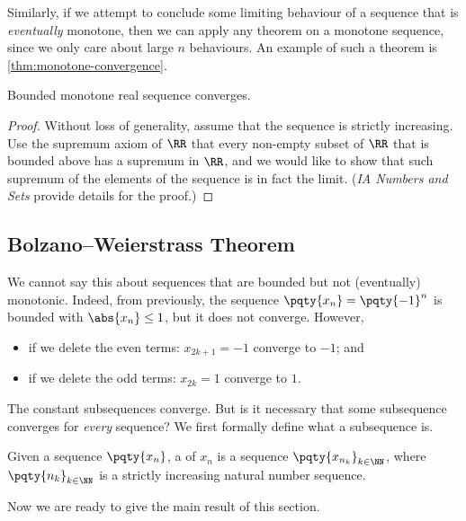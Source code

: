 Similarly, if we attempt to conclude some limiting behaviour of a sequence that is \emph{eventually} monotone, then we can apply any theorem on a monotone sequence, since we only care about large \(n\) behaviours. An example of such a theorem is \autoref{thm:monotone-convergence}.

\begin{theorem}
    \label{thm:monotone-convergence}%
    Bounded monotone real sequence converges.
\end{theorem}

\begin{proof}
    Without loss of generality, assume that the sequence is strictly increasing. Use the supremum axiom of \(\RR\) that every non-empty subset of \(\RR\) that is bounded above has a supremum in \(\RR\), and we would like to show that such supremum of the elements of the sequence is in fact the limit. (\textit{IA Numbers and Sets} provide details for the proof.)
\end{proof}

\subsection{Bolzano--Weierstrass Theorem}

We cannot say this about sequences that are bounded but not (eventually) monotonic. Indeed, from previously, the sequence \(\pqty{x_n} = \pqty{-1}^n\) is bounded with \(\abs{x_n} \leq 1\), but it does not converge. However,
\begin{itemize}
    \item if we delete the even terms: \(x_{2k + 1} = -1\) converge to \(-1\); and
    \item if we delete the odd terms: \(x_{2k} = 1\) converge to \(1\).
\end{itemize}

The constant subsequences converge. But is it necessary that some subsequence converges for \emph{every} sequence? We first formally define what a subsequence is.

\begin{definition}[Subsequence]
    \label{def:seq-subsequence}%
    Given a sequence \(\pqty{x_n}\), a  of \(x_n\) is a sequence \(\pqty{x_{n_k}}_{k \in \NN}\), where \(\pqty{n_k}_{k \in \NN}\) is a strictly increasing natural number sequence.
\end{definition}

Now we are ready to give the main result of this section.

